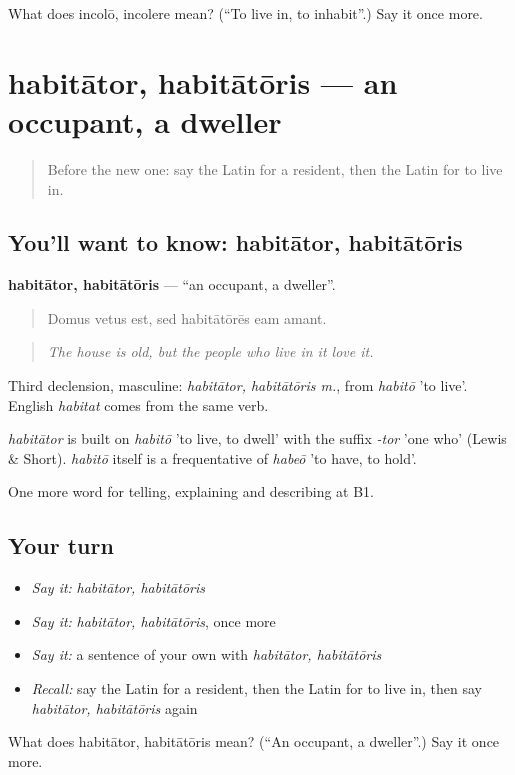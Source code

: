 \begin{tcolorbox}[breakable,colback=teal!4,colframe=teal!35!black,title={Before you move on}]
What does incolō, incolere mean? (\textquotedblleft{}To live in, to inhabit\textquotedblright{}.) Say it once more.
\end{tcolorbox}
\section[habitātor, habitātōris]{habitātor, habitātōris — an occupant, a dweller}

\label{lesson:LA-C456-habitator}



\begin{quote}
Before the new one: say the Latin for a resident, then the Latin for to live in.
\end{quote}

\subsection*{You'll want to know: habitātor, habitātōris}
\textbf{habitātor, habitātōris} — \textquotedblleft{}an occupant, a dweller\textquotedblright{}.

\begin{quote}
Domus vetus est, sed habitātōrēs eam amant.
\end{quote}

\begin{quote}
\emph{The house is old, but the people who live in it love it.}
\end{quote}

Third declension, masculine: \emph{habitātor, habitātōris m.}, from \emph{habitō} 'to live'. English \emph{habitat} comes from the same verb.

\begin{cousinweb}
\emph{habitātor} is built on \emph{habitō} 'to live, to dwell' with the suffix \emph{-tor} 'one who' (Lewis \& Short). \emph{habitō} itself is a frequentative of \emph{habeō} 'to have, to hold'.
\end{cousinweb}

\begin{grammarlens}[title={What you've built}]
One more word for telling, explaining and describing at B1.
\end{grammarlens}

\subsection*{Your turn}
\begin{itemize}
\raggedright
  \item \emph{Say it:} \emph{habitātor, habitātōris}
  \item \emph{Say it:} \emph{habitātor, habitātōris}, once more
  \item \emph{Say it:} a sentence of your own with \emph{habitātor, habitātōris}
  \item \emph{Recall:} say the Latin for a resident, then the Latin for to live in, then say \emph{habitātor, habitātōris} again
\end{itemize}

\begin{tcolorbox}[breakable,colback=teal!4,colframe=teal!35!black,title={Before you move on}]
What does habitātor, habitātōris mean? (\textquotedblleft{}An occupant, a dweller\textquotedblright{}.) Say it once more.
\end{tcolorbox}
